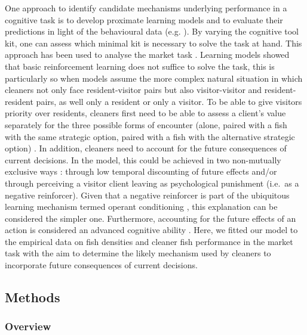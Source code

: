 \documentclass[]{rsos}%
\begin{document}
One approach to identify candidate mechanisms underlying performance in
a cognitive task is to develop proximate learning models and to evaluate
their predictions in light of the behavioural data (e.g.
\citep{dubois_Model_2021}). By varying the cognitive tool kit, one can assess
which minimal kit is necessary to solve the task at hand. This approach
has been used to analyse the market task \citep{prat_Role_2021, quinones_Reinforcement_2019}. Learning models showed that basic
reinforcement learning does not suffice to solve the task, this is
particularly so when models assume the more complex natural situation in
which cleaners not only face resident-visitor pairs but also
visitor-visitor and resident-resident pairs, as well only a resident or
only a visitor. To be able to give visitors priority over residents,
cleaners first need to be able to assess a client's value separately for
the three possible forms of encounter (alone, paired with a fish with
the same strategic option, paired with a fish with the alternative
strategic option) \citep{quinones_Reinforcement_2019}. In addition, cleaners
need to account for the future consequences of current decisions. In the
model, this could be achieved in two non-mutually exclusive ways
\citep{quinones_Reinforcement_2019}: through low temporal discounting of
future effects and/or through perceiving a visitor client leaving as
psychological punishment (i.e.~as a negative reinforcer). Given that a
negative reinforcer is part of the ubiquitous learning mechanism termed
operant conditioning \citep{thorndike_Animal_1898, skinner_Behavior_1938},
this explanation can be
considered the simpler one. Furthermore, accounting for the future
effects of an action is considered an advanced cognitive ability
\citep{suddendorf_Evolution_2007}. Here, we fitted our model to the empirical
data on fish densities and cleaner fish performance in the market task
with the aim to determine the likely mechanism used by cleaners to
incorporate future consequences of current decisions.

\hypertarget{methods}{%
\subsection{Methods}\label{methods}}

\hypertarget{overview}{%
\subsubsection{Overview}\label{overview}}
\end{document}
